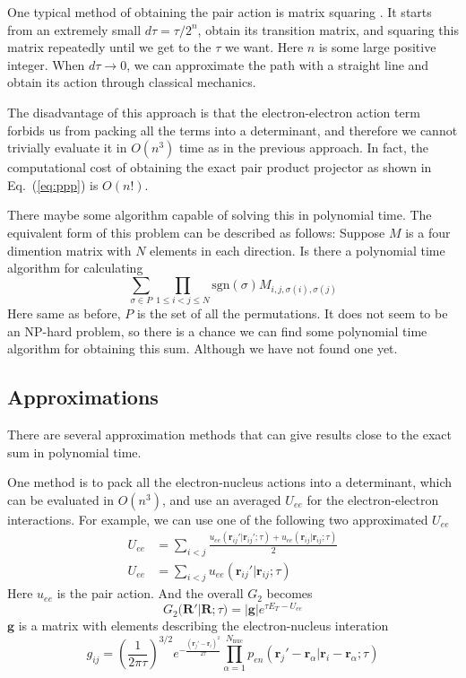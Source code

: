\documentclass[aps,prl,reprint,groupedaddress]{revtex4-1}
\begin{document}
One typical method of obtaining the pair action is matrix squaring \cite{pollock1987path}.
It starts from an extremely small $d\tau = \tau/2^n$, obtain its transition matrix, and squaring this matrix repeatedly until we get to the $\tau$ we want.
Here $n$ is some large positive integer.
When $d\tau \to 0$, we can approximate the path with a straight line and obtain its action through classical mechanics.

The disadvantage of this approach is that the electron-electron action term forbids us from packing all the terms into a determinant, and therefore we cannot trivially evaluate it in $O(n^3)$ time as in the previous approach.
In fact, the computational cost of obtaining the exact pair product projector as shown in Eq.~(\ref{eq:ppp}) is $O(n!)$.

There maybe some algorithm capable of solving this in polynomial time.
The equivalent form of this problem can be described as follows:
Suppose $M$ is a four dimention matrix with $N$ elements in each direction.
Is there a polynomial time algorithm for calculating
\begin{equation}
\label{eq:algo}
\sum\limits_{\sigma \in P}\prod\limits_{1\leq i < j \leq N}\mathrm{sgn}(\sigma)M_{i,j,\sigma(i),\sigma(j)}
\end{equation}
Here same as before, $P$ is the set of all the permutations.
It does not seem to be an NP-hard problem, so there is a chance we can find some polynomial time algorithm for obtaining this sum.
Although we have not found one yet.

\subsection{Approximations}

There are several approximation methods that can give results close to the exact sum in polynomial time.

One method is to pack all the electron-nucleus actions into a determinant, which can be evaluated in $O(n^3)$, and use an averaged $U_{ee}$ for the electron-electron interactions.
For example, we can use one of the following two approximated $U_{ee}$ \cite{umrigar2015observations}
\begin{align}
U_{ee} & = \sum\limits_{i<j}
\frac{u_{ee}(\bm{r}_{ij}'|\bm{r}_{ij}';\tau) + u_{ee}(\bm{r}_{ij}|\bm{r}_{ij};\tau)}{2}\\
U_{ee} & = \sum\limits_{i<j}u_{ee}(\bm{r}_{ij}'|\bm{r}_{ij};\tau)
\end{align}
Here $u_{ee}$ is the pair action.
And the overall $G_2$ becomes
\begin{equation}
\label{eq:G2pppUee}
G_2(\bm{R'}|\bm{R};\tau) = |\bm{g}|e^{\tau E_T-U_{ee}}
\end{equation}
$\bm{g}$ is a matrix with elements describing the electron-nucleus interation
\begin{equation}
g_{ij} = \left(\frac{1}{2\pi\tau}\right)^{3/2}e^{-\frac{(\bm{r}_j'-\bm{r}_i)^2}{2\tau}} \prod\limits_{\alpha = 1}^{N_{\mathrm{nuc}}}
p_{en}(\bm{r}_j'-\bm{r}_\alpha|\bm{r}_i-\bm{r}_\alpha;\tau)
\end{equation}
\end{document}
